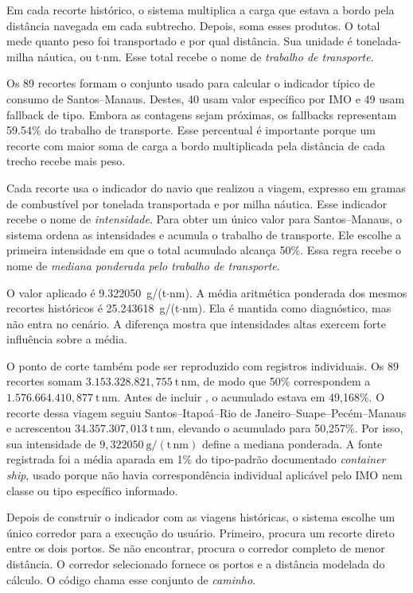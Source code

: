 Em cada recorte histórico, o sistema multiplica a carga que estava a bordo pela distância navegada em cada subtrecho. Depois, soma esses produtos. O total mede quanto peso foi transportado e por qual distância. Sua unidade é tonelada-milha náutica, ou t$\cdot$nm. Esse total recebe o nome de \emph{trabalho de transporte}.

Os 89 recortes formam o conjunto usado para calcular o indicador típico de consumo de Santos--Manaus. Destes, \num{40} usam valor específico por IMO e \num{49} usam fallback de tipo. Embora as contagens sejam próximas, os fallbacks representam \num{59.54}\% do trabalho de transporte. Esse percentual é importante porque um recorte com maior soma de carga a bordo multiplicada pela distância de cada trecho recebe mais peso.

Cada recorte usa o indicador do navio que realizou a viagem, expresso em gramas de combustível por tonelada transportada e por milha náutica. Esse indicador recebe o nome de \emph{intensidade}. Para obter um único valor para Santos--Manaus, o sistema ordena as intensidades e acumula o trabalho de transporte. Ele escolhe a primeira intensidade em que o total acumulado alcança 50\%. Essa regra recebe o nome de \emph{mediana ponderada pelo trabalho de transporte}.

O valor aplicado é \num{9.322050}~g/(t$\cdot$nm). A média aritmética ponderada dos mesmos recortes históricos é \num{25.243618}~g/(t$\cdot$nm). Ela é mantida como diagnóstico, mas não entra no cenário. A diferença mostra que intensidades altas exercem forte influência sobre a média.

O ponto de corte também pode ser reproduzido com registros individuais. Os 89 recortes somam \(3.153.328.821{,}755~\mathrm{t\,nm}\), de modo que 50\% correspondem a \(1.576.664.410{,}877~\mathrm{t\,nm}\). Antes de incluir , o acumulado estava em 49,168\%. O recorte dessa viagem seguiu Santos--Itapoá--Rio de Janeiro--Suape--Pecém--Manaus e acrescentou \(34.357.307{,}013~\mathrm{t\,nm}\), elevando o acumulado para 50,257\%. Por isso, sua intensidade de \(9{,}322050~\mathrm{g/(t\,nm)}\) define a mediana ponderada. A fonte registrada foi a média aparada em 1\% do tipo-padrão documentado \emph{container ship}, usado porque não havia correspondência individual aplicável pelo IMO nem classe ou tipo específico informado.

Depois de construir o indicador com as viagens históricas, o sistema escolhe um único corredor para a execução do usuário. Primeiro, procura um recorte direto entre os dois portos. Se não encontrar, procura o corredor completo de menor distância. O corredor selecionado fornece os portos e a distância modelada do cálculo. O código chama esse conjunto de \emph{caminho}.

